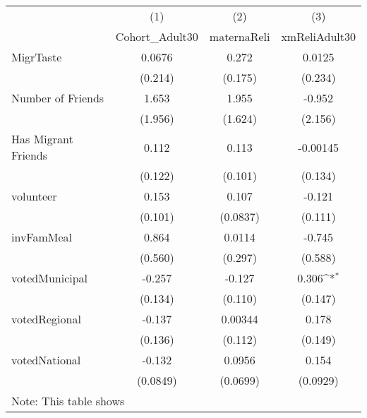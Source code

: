 {
\def\sym#1{\ifmmode^{#1}\else\(^{#1}\)\fi}
\begin{tabular}{l*{3}{c}}
\hline\hline
            &\multicolumn{1}{c}{(1)}&\multicolumn{1}{c}{(2)}&\multicolumn{1}{c}{(3)}\\
            &\multicolumn{1}{c}{Cohort\_Adult30}&\multicolumn{1}{c}{maternaReli}&\multicolumn{1}{c}{xmReliAdult30}\\
\hline
MigrTaste   &      0.0676         &       0.272         &      0.0125         \\
            &     (0.214)         &     (0.175)         &     (0.234)         \\
[1em]
Number of Friends&       1.653         &       1.955         &      -0.952         \\
            &     (1.956)         &     (1.624)         &     (2.156)         \\
[1em]
Has Migrant Friends&       0.112         &       0.113         &    -0.00145         \\
            &     (0.122)         &     (0.101)         &     (0.134)         \\
[1em]
volunteer   &       0.153         &       0.107         &      -0.121         \\
            &     (0.101)         &    (0.0837)         &     (0.111)         \\
[1em]
invFamMeal  &       0.864         &      0.0114         &      -0.745         \\
            &     (0.560)         &     (0.297)         &     (0.588)         \\
[1em]
votedMunicipal&      -0.257         &      -0.127         &       0.306\sym{*}  \\
            &     (0.134)         &     (0.110)         &     (0.147)         \\
[1em]
votedRegional&      -0.137         &     0.00344         &       0.178         \\
            &     (0.136)         &     (0.112)         &     (0.149)         \\
[1em]
votedNational&      -0.132         &      0.0956         &       0.154         \\
            &    (0.0849)         &    (0.0699)         &    (0.0929)         \\
\hline\hline
\multicolumn{4}{l}{\footnotesize Note: This table shows}\\
\end{tabular}
}
